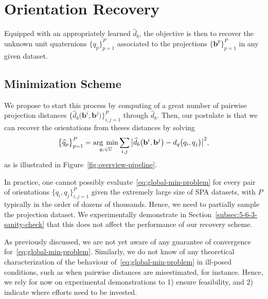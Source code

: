 \section{Orientation Recovery}
\label{sec:orientation-recovery}

Equipped with an appropriately learned $\widehat{d}_b$, the objective is then to recover the unknown unit quaternions $\big\{q_p\big\}_{p=1}^P$ associated to the projections $\big\{\mathbf{b}^p\big\}_{p=1}^P$ in any given dataset.

\subsection{Minimization Scheme}

We propose to start this process by computing of a great number of pairwise projection distances $\big\{\widehat{d}_b\big(\mathbf{b}^i,\mathbf{b}^j\big)\big\}_{i,j=1}^{P}$ through $\widehat{d}_b$. Then, our postulate is that we can recover the orientations from theses distances by solving 
\begin{equation}
    \label{eq:global-min-problem}
    \big\{\widehat{q}_p\big\}_{p=1}^P=\underset{q_i\in\mathbb{U}}{\arg\;\min}\sum_{i,j} \big|\widehat{d}_b\big(\mathbf{b}^i,\mathbf{b}^j\big) - d_q\big(q_i,q_j\big) \big|^2,  
\end{equation}
as is illustrated in Figure~\ref{fig:overview-pipeline}. 

In practice, one cannot possibly evaluate~\eqref{eq:global-min-problem} for every pair of orientations $\big\{q_i,q_j\big\}_{i,j=1}^P$ given the extremely large size of SPA datasets, with $P$ typically in the order of dozens of thousands. Hence, we need to partially sample the projection dataset. We experimentally demonstrate in Section~\ref{subsec:5-6-3-sanity-check} that this does not affect the performance of our recovery scheme.   

As previously discussed, we are not yet aware of any guarantee of convergence for~\eqref{eq:global-min-problem}. Similarly, we do not know of any theoretical characterization of the behaviour of~\eqref{eq:global-min-problem} in ill-posed conditions, such as when pairwise distances are misestimated, for instance. Hence, we rely for now on experimental demonstrations to 1) ensure feasibility, and 2) indicate where efforts need to be invested. 

